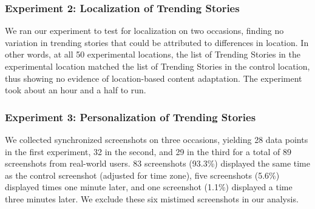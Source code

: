 \begin{comment}
\pgfplotstableread[row sep=\\,col sep=&]{
interval & pct \\
0--5     & 0 \\
5--10     & 7.6923077 \\
10--15    & 38.4615385\\
15--20   & 23.0769231 \\
20--25   & 3.8461538 \\
25--30   & 7.6923077 \\
30--35   & 7.6923077 \\
35+      & 11.5384615 \\
    }\mydata
    
    
    
\begin{figure}[t]
\begin{center}
\begin{tikzpicture}
    \begin{axis}[
            ybar,
            symbolic x coords={0--5,5--10,10--15,15--20,20--25,25--30,30--35,35+},
            ymajorgrids=true,
nodes near coords=\pgfmathprintnumber{\pgfplotspointmeta}\%,
every node near coord/.append style={font=\scriptsize},
nodes near coords style={/pgf/number format/.cd,fixed zerofill,precision=1},
            xtick=data,
        ]
        \addplot[fill=gray,draw=none] table[x=interval,y=pct]{\mydata};
    \end{axis}
\end{tikzpicture}
\end{center}
\caption{Relative distribution of minutes between updates}\label{minutes-between-updates}
\end{figure}
\end{comment}

\subsubsection{Experiment 2: Localization of Trending Stories}
We ran our experiment to test for localization on two occasions, finding no variation in trending stories that could be attributed to differences in location. In other words, at all 50 experimental locations, the list of Trending Stories in the experimental location matched the list of Trending Stories in the control location, thus showing no evidence of location-based content adaptation. The experiment took about an hour and a half to run.

\subsubsection{Experiment 3: Personalization of Trending Stories}
We collected synchronized screenshots on three occasions, yielding 28 data points in the first experiment, 32 in the second, and 29 in the third for a total of 89 screenshots from real-world users. 83 screenshots (93.3\%) displayed the same time as the control screenshot (adjusted for time zone), five screenshots (5.6\%) displayed times one minute later, and one screenshot (1.1\%) displayed a time three minutes later. We exclude these six mistimed screenshots in our analysis.

